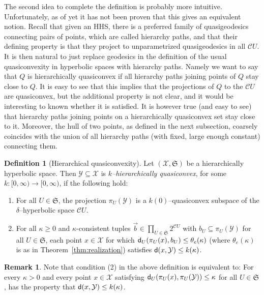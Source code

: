 \documentclass[11pt,oneside]{amsart}
\theoremstyle{definition}
\newtheorem{defn}[thm]{Definition}
\newtheorem{rem}[thm]{Remark}
\newcommand{\tup}[1]{\vec{#1}}
\newcommand{\co}{\colon}
\newcommand{\dist}{\textup{\textsf{d}}}
\newcommand{\cuco}[1]{{\mathcal #1}}
\newcommand{\fontact}{{\mathcal C}}
\begin{document}
The second idea to complete the definition is probably more intuitive. Unfortunately, as of yet it has not been proven that this gives an equivalent notion. Recall that given an HHS, there is a preferred family of quasigeodesics connecting pairs of points, which are called hierarchy paths, and that their defining property is that they project to unparametrized quasigeodesics in all $\fontact U$. It is then natural to just replace geodesics in the definition of the usual quasiconvexity in hyperbolic spaces with hierarchy paths. Namely we want to say that $Q$ is hierarchically quasiconvex if all hierarchy paths joining points of $Q$ stay close to $Q$. It is easy to see that this implies that the projections of $Q$ to the $\fontact U$ are quasiconvex, but the additional property is not clear, and it would be interesting to known whether it is satisfied. It is however true (and easy to see) that hierarchy paths joining points on a hierarchically quasiconvex set stay close to it. Moreover, the hull of two points, as defined in the next subsection, coarsely coincides with the union of all hierarchy paths (with fixed, large enough constant) connecting them.

\begin{defn}[Hierarchical quasiconvexity]\label{defn:hierarchical_quasiconvexity}\cite[Definition 5.1]{HHS2}
Let $(\cuco X,\mathfrak S)$ be a hierarchically hyperbolic space.  
Then $\cuco Y\subseteq\cuco X$ is \emph{$k$--hierarchically quasiconvex}, for some $k\co[0,\infty)\to[0,\infty)$, if the following hold:
\begin{enumerate}
 \item For all $U\in\mathfrak S$, the projection $\pi_U(\cuco Y)$ is 
 a $k(0)$--quasiconvex subspace of the $\delta$--hyperbolic space $\fontact U$.
 \item For all $\kappa\geq0$ and $\kappa$-consistent tuples $\tup
 b\in\prod_{U\in\mathfrak S}2^{\fontact U}$ with $b_U\subseteq\pi_U(\cuco Y)$ for all $U\in\mathfrak S$, each point
 $x\in\cuco X$ for which $\dist_{
 U}(\pi_U(x),b_U)\leq\theta_e(\kappa)$ (where $\theta_e(\kappa)$ is as in Theorem~\ref{thm:realization}) satisfies $\dist(x,\cuco Y)\leq
 k(\kappa)$.
\end{enumerate}
\end{defn}

\begin{rem} Note that condition (2) in the above definition is 
    equivalent to:  For every $\kappa>0$ and every point 
    $x\in\cuco X$ satisfying 
    $\dist_{U}(\pi_U(x),\pi_{U}(\cuco Y))\leq\kappa$ 
    for all $U\in\mathfrak S$, has the property that 
    $\dist(x,\cuco Y)\leq k(\kappa)$.
\end{rem}
\end{document}
